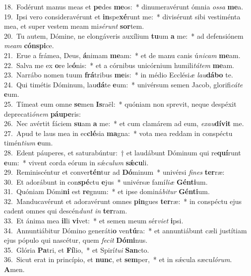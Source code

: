 {18.~}Fodérunt manus meas et \textbf{pe}des \textbf{me}os:~* dinumeravérunt ómnia \textit{os}\textit{sa} \textbf{me}a.\\
{19.~}Ipsi vero consideravérunt et \textbf{in}spe\textbf{xé}runt me:~* divisérunt sibi vestiménta mea, et super vestem meam mi\textit{sé}\textit{runt} \textbf{sor}tem.\\
{20.~}Tu autem, Dómine, ne elongáveris auxílium \textbf{tu}um \textbf{a} me:~* ad defensiónem \textit{me}\textit{am} \textbf{cón}\textbf{spi}ce.\\
{21.~}Erue a frámea, Deus, \textbf{á}nimam \textbf{me}am:~* et de manu canis ú\textit{ni}\textit{cam} \textbf{me}am.\\
{22.~}Salva me ex \textbf{o}re le\textbf{ó}nis:~* et a córnibus unicórnium humili\textit{tá}\textit{tem} \textbf{me}am.\\
{23.~}Narrábo nomen tuum \textbf{frá}tribus \textbf{me}is:~* in médio Ecclési\textit{æ} \textit{lau}\textbf{dá}\textbf{bo} te.\\
{24.~}Qui timétis Dóminum, lau\textbf{dá}te \textbf{e}um:~* univérsum semen Jacob, glorifi\textit{cá}\textit{te} \textbf{e}um.\\
{25.~}Tímeat eum omne \textbf{se}men \textbf{Is}raël:~* quóniam non sprevit, neque despéxit deprecati\textit{ó}\textit{nem} \textbf{páu}\textbf{pe}ris:\\
{26.~}Nec avértit fáciem \textbf{su}am \textbf{a} me:~* et cum clamárem ad eum, \textit{e}\textit{xau}\textbf{dí}\textbf{vit} me.\\
{27.~}Apud te laus mea in ec\textbf{clé}sia \textbf{ma}gna:~* vota mea reddam in conspéctu timén\textit{ti}\textit{um} \textbf{e}um.\\
{28.~}Edent páuperes, et saturabúntur:~† et laudábunt Dóminum qui re\textbf{quí}runt \textbf{e}um:~* vivent corda eórum in sǽ\textit{cu}\textit{lum} \textbf{sǽ}\textbf{cu}li.\\
{29.~}Reminiscéntur et conver\textbf{tén}tur ad \textbf{Dó}minum~* univérsi \textit{fi}\textit{nes} \textbf{ter}ræ:\\
{30.~}Et adorábunt in con\textbf{spé}ctu \textbf{e}jus~* univérsæ famí\textit{li}\textit{æ} \textbf{Gén}\textbf{ti}um.\\
{31.~}Quóniam Dómi\textbf{ni} est \textbf{re}gnum:~* et ipse dominá\textit{bi}\textit{tur} \textbf{Gén}\textbf{ti}um.\\
{32.~}Manducavérunt et adoravérunt omnes \textbf{pin}gues \textbf{ter}ræ:~* in conspéctu ejus cadent omnes qui descén\textit{dunt} \textit{in} \textbf{ter}ram.\\
{33.~}Et ánima mea \textbf{il}li \textbf{vi}vet:~* et semen meum sér\textit{vi}\textit{et} \textbf{i}psi.\\
{34.~}Annuntiábitur Dómino generáti\textbf{o} ven\textbf{tú}ra:~* et annuntiábunt cæli justítiam ejus pópulo qui nascétur, quem \textit{fe}\textit{cit} \textbf{Dó}\textbf{mi}nus.\\
{35.~}Glória \textbf{Pa}tri, et \textbf{Fí}lio,~* et Spirí\textit{tu}\textit{i} \textbf{San}cto.\\
{36.~}Sicut erat in princípio, et \textbf{nunc}, et \textbf{sem}per,~* et in sǽcula sæcu\textit{ló}\textit{rum}. \textbf{A}men.\\
